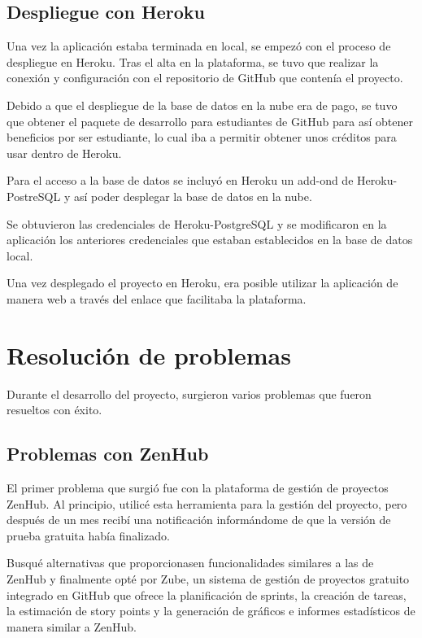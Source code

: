 
\subsection{Despliegue con Heroku}
Una vez la aplicación estaba terminada en local, se empezó con el proceso de despliegue en Heroku. Tras el alta en la plataforma, se tuvo que realizar la conexión y configuración con el repositorio de GitHub que contenía el proyecto.

Debido a que el despliegue de la base de datos en la nube era de pago, se tuvo que obtener el paquete de desarrollo para estudiantes de GitHub para así obtener beneficios por ser estudiante, lo cual iba a permitir obtener unos créditos para usar dentro de Heroku.

Para el acceso a la base de datos se incluyó en Heroku un add-ond de Heroku-PostreSQL y así poder desplegar la base de datos en la nube. 

Se obtuvieron las credenciales de Heroku-PostgreSQL y se modificaron en la aplicación los anteriores credenciales que estaban establecidos en la base de datos local.

Una vez desplegado el proyecto en Heroku, era posible utilizar la aplicación de manera web a través del enlace que facilitaba la plataforma.

\section{Resolución de problemas}
Durante el desarrollo del proyecto, surgieron varios problemas que fueron resueltos con éxito.

\subsection{Problemas con ZenHub}
El primer problema que surgió fue con la plataforma de gestión de proyectos ZenHub. Al principio, utilicé esta herramienta para la gestión del proyecto, pero después de un mes recibí una notificación informándome de que la versión de prueba gratuita había finalizado.

Busqué alternativas que proporcionasen funcionalidades similares a las de ZenHub y finalmente opté por Zube, un sistema de gestión de proyectos gratuito integrado en GitHub que ofrece la planificación de sprints, la creación de tareas, la estimación de story points y la generación de gráficos e informes estadísticos de manera similar a ZenHub.


